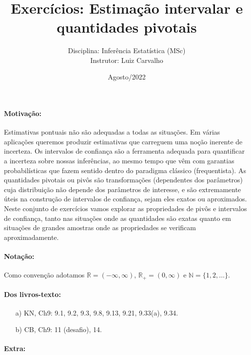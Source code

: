 \documentclass[a4paper,10pt, notitlepage]{report}
\title{Exercícios: Estimação intervalar e quantidades pivotais}
\author{Disciplina: Inferência Estatística (MSc) \\ Instrutor: Luiz Carvalho}
\date{Agosto/2022}
\newcommand{\rpl}{\mathbb{R}_+}
\begin{document}
\maketitle

\paragraph{Motivação:} Estimativas pontuais não são adequadas a todas as situações.
Em várias aplicações queremos produzir estimativas que carreguem uma noção inerente de incerteza. 
Os intervalos de confiança são a ferramenta adequada para quantificar a incerteza sobre nossas inferências, ao mesmo tempo que vêm com garantias probabilísticas que fazem sentido dentro do paradigma clássico (frequentista).
As quantidades pivotais ou pivôs são transformações (dependentes dos parâmetros) cuja distribuição não depende dos parâmetros de interesse, e são extremamente úteis na construção de intervalos de confiança, sejam eles exatos ou aproximados.
Neste conjunto de exercícios vamos explorar as propriedades de pivôs e intervalos de confiança, tanto nas situações onde as quantidades são exatas quanto em situações de grandes amostras onde as propriedades se verificam aproximadamente.

\paragraph{Notação:} Como convenção adotamos $\mathbb{R} = (-\infty, \infty)$, $\rpl = (0, \infty)$ e $\mathbb{N} = \{1, 2, \ldots \}$.

\paragraph{Dos livros-texto:}

\begin{itemize}
    \item[a)] KN, Ch9:  9.1, 9.2, 9.3, 9.8, 9.13, 9.21, 9.33(a), 9.34.
    \item[b)] CB, Ch9: 11 (desafio), 14.
\end{itemize}

\paragraph{Extra:}
\end{document}
